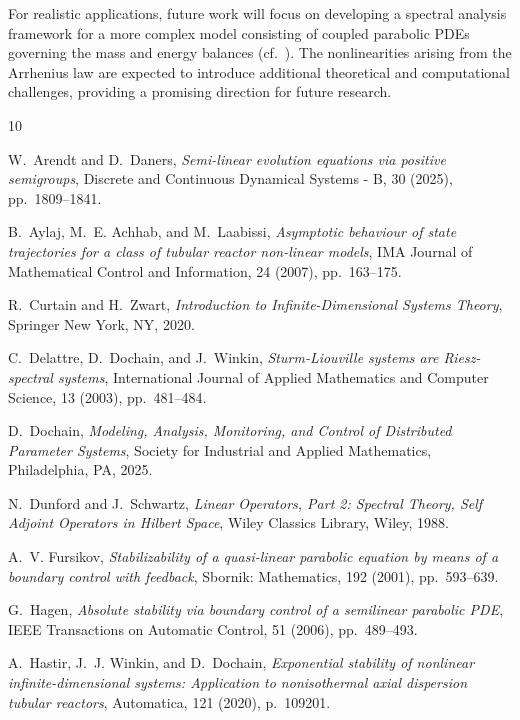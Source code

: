 \documentclass{mpi2015-cscpreprint}
\numberwithin{equation}{section}
\begin{document}
For realistic applications, future work will focus on developing a spectral analysis framework for a more complex model consisting of coupled parabolic PDEs governing the mass and energy balances  (cf.~\cite{SH13}). The nonlinearities arising from the Arrhenius law are expected to introduce additional theoretical and computational challenges, providing a promising direction for future research.


\begin{thebibliography}{10}

{W.~Arendt and D.~Daners}, {\em Semi-linear evolution equations via
  positive semigroups}, Discrete and Continuous Dynamical Systems - B, 30
  (2025), pp.~1809--1841.

{B.~Aylaj, M.~E. Achhab, and M.~Laabissi}, {\em Asymptotic behaviour of
  state trajectories for a class of tubular reactor non-linear models}, IMA
  Journal of Mathematical Control and Information, 24 (2007), pp.~163--175.

{R.~Curtain and H.~Zwart}, {\em Introduction to Infinite-Dimensional
  Systems Theory}, Springer New York, NY, 2020.

{C.~Delattre, D.~Dochain, and J.~Winkin}, {\em Sturm-{L}iouville systems
  are {Riesz}-spectral systems}, International Journal of Applied Mathematics
  and Computer Science, 13 (2003), pp.~481--484.

{D.~Dochain}, {\em Modeling, Analysis, Monitoring, and Control of
  Distributed Parameter Systems}, Society for Industrial and Applied
  Mathematics, Philadelphia, PA, 2025.

{N.~Dunford and J.~Schwartz}, {\em Linear Operators, Part 2: Spectral
  Theory, Self Adjoint Operators in Hilbert Space}, Wiley Classics Library,
  Wiley, 1988.

{A.~V. Fursikov}, {\em Stabilizability of a quasi-linear parabolic equation
  by means of a boundary control with feedback}, Sbornik: Mathematics, 192
  (2001), pp.~593--639.

{G.~Hagen}, {\em Absolute stability via boundary control of a semilinear
  parabolic {PDE}}, IEEE Transactions on Automatic Control, 51 (2006),
  pp.~489--493.

{A.~Hastir, J.~J. Winkin, and D.~Dochain}, {\em Exponential stability of
  nonlinear infinite-dimensional systems: Application to nonisothermal axial
  dispersion tubular reactors}, Automatica, 121 (2020), p.~109201.


\end{thebibliography}
\end{document}
